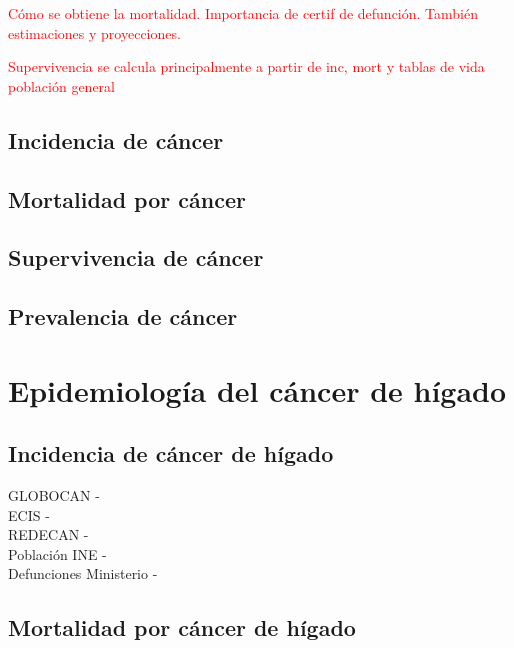 \textcolor{red}{Cómo se obtiene la mortalidad. Importancia de certif de defunción. También estimaciones y proyecciones.}

\textcolor{red}{Supervivencia se calcula principalmente a partir de inc, mort y tablas de vida población general}

\subsection{Incidencia de cáncer}

\subsection{Mortalidad por cáncer}

\subsection{Supervivencia de cáncer} 

\subsection{Prevalencia de cáncer}




\section{Epidemiología del cáncer de hígado}

\subsection{Incidencia de cáncer de hígado}

GLOBOCAN - \cite{Bray2018, GCO}\\

ECIS - \cite{ECIS, ECIS2}\\

REDECAN - \cite{REDECAN2020}\\

Población INE - \cite{INEpob}\\

Defunciones Ministerio - \cite{MSCBS}

\subsection{Mortalidad por cáncer de hígado}

